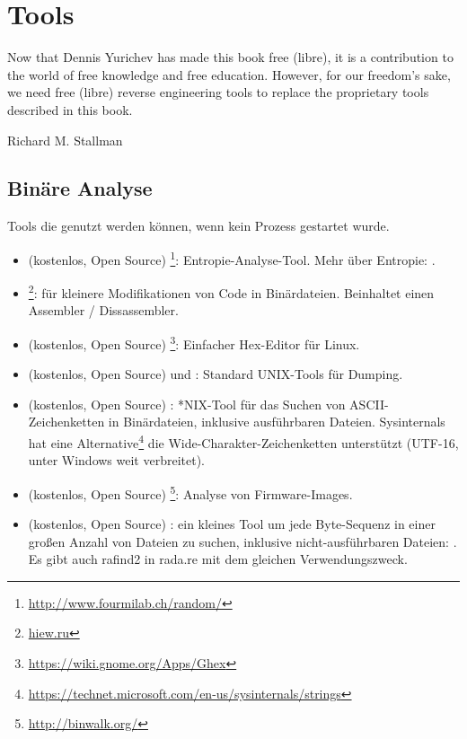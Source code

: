\chapter{Tools}

\epigraph{Now that Dennis Yurichev has made this book free (libre), it is a
contribution to the world of free knowledge and free education.
However, for our freedom's sake, we need free (libre) reverse
engineering tools to replace the proprietary tools described in this book.}{Richard M. Stallman}

\section{Binäre Analyse}

Tools die genutzt werden können, wenn kein Prozess gestartet wurde.


\begin{itemize}
\item
(kostenlos, Open Source) \footnote{\url{http://www.fourmilab.ch/random/}}: Entropie-Analyse-Tool.
Mehr über Entropie: .

\item
\label{Hiew}
\footnote{\href{http://go.yurichev.com/17035}{hiew.ru}}:
für kleinere Modifikationen von Code in Binärdateien.
Beinhaltet einen Assembler / Dissassembler.

\item (kostenlos, Open Source) \footnote{\url{https://wiki.gnome.org/Apps/Ghex}}: Einfacher Hex-Editor für Linux.

\item (kostenlos, Open Source)  und : Standard UNIX-Tools für Dumping.

\item (kostenlos, Open Source) : *NIX-Tool für das Suchen von ASCII-Zeichenketten in Binärdateien,
inklusive ausführbaren Dateien.
Sysinternals hat eine Alternative\footnote{\url{https://technet.microsoft.com/en-us/sysinternals/strings}}
die Wide-Charakter-Zeichenketten unterstützt (UTF-16, unter Windows weit verbreitet).

\item (kostenlos, Open Source) \footnote{\url{http://binwalk.org/}}: Analyse von Firmware-Images.

\item
{}
(kostenlos, Open Source) :
ein kleines Tool um jede Byte-Sequenz in einer großen Anzahl von Dateien zu suchen,
inklusive nicht-ausführbaren Dateien: \BGREPURL.
Es gibt auch rafind2 in rada.re mit dem gleichen Verwendungszweck.
\end{itemize}

